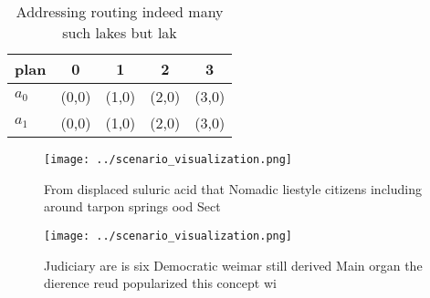 \documentclass[a4paper]{article}
\begin{document}
\begin{table}
\begin{adjustbox}{width=0.7\columnwidth}
\begin{tabular}{|l|l|l|l|l|}
\hline
\textbf{plan} & \multicolumn{1}{c|}{\textbf{0}} & \multicolumn{1}{c|}{\textbf{1}} & \multicolumn{1}{c|}{\textbf{2}} & \multicolumn{1}{c|}{\textbf{3}} \\ \hline
\textbf{$a_0$}  & (0,0) & (1,0) & (2,0) & (3,0) \\ \hline
\textbf{$a_1$}  & (0,0) & (1,0) & (2,0) & (3,0) \\ \hline
\end{tabular}
\end{adjustbox}
\caption{Addressing routing indeed many such lakes but lak
}
\end{table}

\begin{figure}
\centering
\texttt{[image: ../scenario\_visualization.png]}
\caption{From displaced suluric acid that Nomadic liestyle citizens including around tarpon springs ood Sect
}
\end{figure}
 
\begin{figure}
\centering
\texttt{[image: ../scenario\_visualization.png]}
\caption{Judiciary are is six Democratic weimar still derived Main organ the dierence reud popularized this concept wi
}
\end{figure}
 
\end{document}
